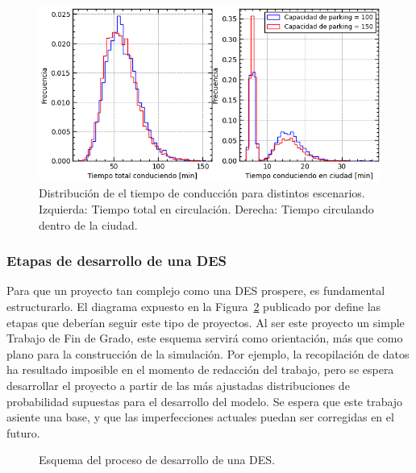 \begin{figure}
	\begin{center}
		\includegraphics[width=\textwidth]{fig/2_fig_example_03}
	\end{center}
	\caption{Distribución de el tiempo de conducción para distintos escenarios. Izquierda: Tiempo total en circulación. Derecha: Tiempo circulando dentro de la ciudad.}
	\label{fig:2_fig_example_03}
\end{figure}

\subsubsection{Etapas de desarrollo de una DES}

Para que un proyecto tan complejo como una DES prospere, es fundamental estructurarlo.
El diagrama expuesto en la Figura~\ref{fig:2_fc_sim_cookbook} publicado por \citep{banks1998handbook}
define las etapas que deberían seguir este tipo de proyectos.
Al ser este proyecto un simple Trabajo de Fin de Grado,
este esquema servirá como orientación, más que como plano para la construcción de la simulación.
Por ejemplo, la recopilación de datos ha resultado imposible en el momento de redacción del trabajo,
pero se espera desarrollar el proyecto
a partir de las más ajustadas distribuciones de probabilidad supuestas para el desarrollo del modelo.
Se espera que este trabajo asiente una base,
y que las imperfecciones actuales puedan ser corregidas en el futuro.

\begin{figure}
	\begin{center}
		
	\end{center}
	\caption{Esquema del proceso de desarrollo de una DES.}
	\label{fig:2_fc_sim_cookbook}
\end{figure}

